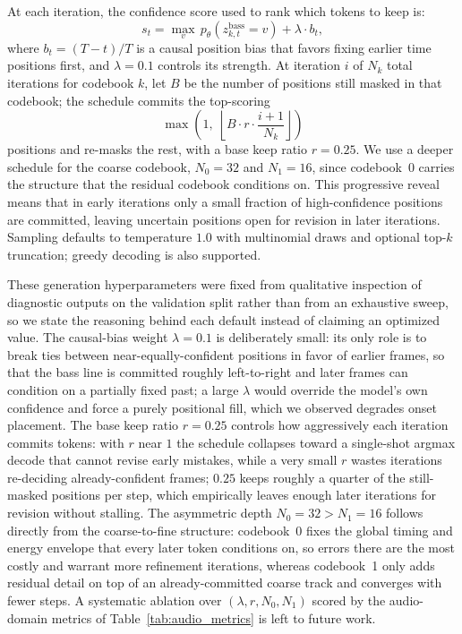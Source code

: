 \documentclass{article}
\begin{document}
At each iteration, the confidence score used to rank which tokens to keep is:
\begin{equation}
    s_{t} = \max_v\, p_\theta(z^{\mathrm{bass}}_{k,t} = v) + \lambda \cdot b_t,
\end{equation}
where $b_t = (T - t) / T$ is a causal position bias that favors fixing earlier time positions first, and $\lambda = 0.1$ controls its strength. At iteration $i$ of $N_k$ total iterations for codebook $k$, let $B$ be the number of positions still masked in that codebook; the schedule commits the top-scoring
\begin{equation}
    \max\!\left(1,\; \left\lfloor B \cdot r \cdot \frac{i+1}{N_k} \right\rfloor\right)
\end{equation}
positions and re-masks the rest, with a base keep ratio $r = 0.25$. We use a deeper schedule for the coarse codebook, $N_0 = 32$ and $N_1 = 16$, since codebook~0 carries the structure that the residual codebook conditions on. This progressive reveal means that in early iterations only a small fraction of high-confidence positions are committed, leaving uncertain positions open for revision in later iterations. Sampling defaults to temperature $1.0$ with multinomial draws and optional top-$k$ truncation; greedy decoding is also supported.

These generation hyperparameters were fixed from qualitative inspection of diagnostic outputs on the validation split rather than from an exhaustive sweep, so we state the reasoning behind each default instead of claiming an optimized value. The causal-bias weight $\lambda=0.1$ is deliberately small: its only role is to break ties between near-equally-confident positions in favor of earlier frames, so that the bass line is committed roughly left-to-right and later frames can condition on a partially fixed past; a large $\lambda$ would override the model's own confidence and force a purely positional fill, which we observed degrades onset placement. The base keep ratio $r=0.25$ controls how aggressively each iteration commits tokens: with $r$ near $1$ the schedule collapses toward a single-shot argmax decode that cannot revise early mistakes, while a very small $r$ wastes iterations re-deciding already-confident frames; $0.25$ keeps roughly a quarter of the still-masked positions per step, which empirically leaves enough later iterations for revision without stalling. The asymmetric depth $N_0=32 > N_1=16$ follows directly from the coarse-to-fine structure: codebook~0 fixes the global timing and energy envelope that every later token conditions on, so errors there are the most costly and warrant more refinement iterations, whereas codebook~1 only adds residual detail on top of an already-committed coarse track and converges with fewer steps. A systematic ablation over $(\lambda, r, N_0, N_1)$ scored by the audio-domain metrics of Table~\ref{tab:audio_metrics} is left to future work.
\end{document}
